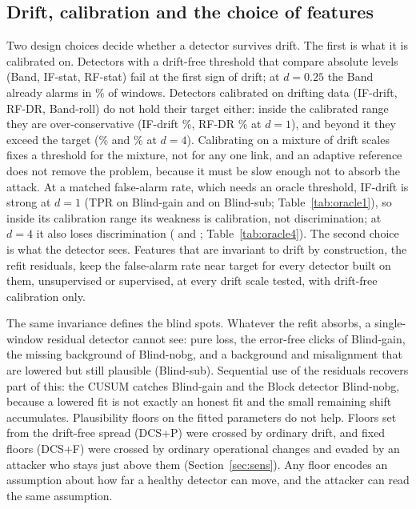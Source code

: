 \subsection{Drift, calibration and the choice of features}
Two design choices decide whether a detector survives drift. The first is what it is calibrated on. Detectors with a drift-free threshold that compare absolute levels (Band, IF-stat, RF-stat) fail at the first sign of drift; at $d=0.25$ the Band already alarms in \fprBandDQuarter\% of windows. Detectors calibrated on drifting data (IF-drift, RF-DR, Band-roll) do not hold their target either: inside the calibrated range they are over-conservative (IF-drift \fprIFdriftDOne\%, RF-DR \fprRFDRDOne\% at $d=1$), and beyond it they exceed the target (\fprIFdriftDFour\% and \fprRFDRDFour\% at $d=4$). Calibrating on a mixture of drift scales fixes a threshold for the mixture, not for any one link, and an adaptive reference does not remove the problem, because it must be slow enough not to absorb the attack. At a matched false-alarm rate, which needs an oracle threshold, IF-drift is strong at $d=1$ (TPR \tprOrGainIFdriftDOne{} on Blind-gain and \tprOrSubIFdriftDOne{} on Blind-sub; Table~\ref{tab:oracle1}), so inside its calibration range its weakness is calibration, not discrimination; at $d=4$ it also loses discrimination (\tprOrGainIFdriftDFour{} and \tprOrSubIFdriftDFour; Table~\ref{tab:oracle4}). The second choice is what the detector sees. Features that are invariant to drift by construction, the refit residuals, keep the false-alarm rate near target for every detector built on them, unsupervised or supervised, at every drift scale tested, with drift-free calibration only.

The same invariance defines the blind spots. Whatever the refit absorbs, a single-window residual detector cannot see: pure loss, the error-free clicks of Blind-gain, the missing background of Blind-nobg, and a background and misalignment that are lowered but still plausible (Blind-sub). Sequential use of the residuals recovers part of this: the CUSUM catches Blind-gain and the Block detector Blind-nobg, because a lowered fit is not exactly an honest fit and the small remaining shift accumulates. Plausibility floors on the fitted parameters do not help. Floors set from the drift-free spread (DCS+P) were crossed by ordinary drift, and fixed floors (DCS+F) were crossed by ordinary operational changes and evaded by an attacker who stays just above them (Section~\ref{sec:sens}). Any floor encodes an assumption about how far a healthy detector can move, and the attacker can read the same assumption.

